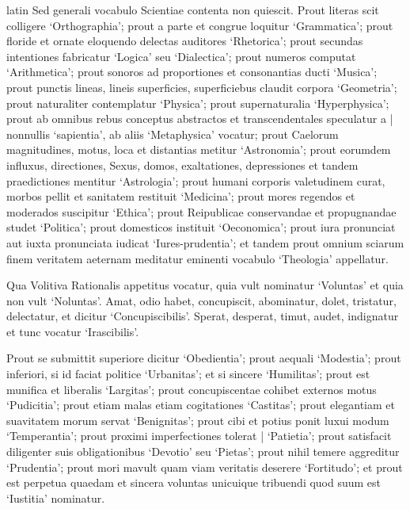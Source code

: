 \begin{otherlanguage*}{latin}
\pstart
 Sed generali vocabulo Scientiae contenta non quiescit. Prout literas scit colligere `Orthographia'; prout a parte et congrue loquitur `Grammatica'; prout floride et ornate eloquendo delectas auditores `Rhetorica'; prout secundas intentiones fabricatur `Logica' seu `Dialectica'; prout numeros computat `Arithmetica'; prout sonoros ad proportiones et consonantias ducti `Musica'; prout punctis lineas, lineis superficies, superficiebus claudit corpora `Geometria'; prout naturaliter contemplatur `Physica'; prout supernaturalia `Hyperphysica'; prout ab omnibus rebus conceptus abstractos et transcendentales speculatur a \textnormal{|}  nonnullis `sapientia', ab aliis `Metaphysica' vocatur; prout Caelorum magnitudines, motus, loca et distantias metitur `Astronomia'; prout eorumdem influxus, directiones, Sexus, domos, exaltationes, depressiones et tandem praedictiones mentitur `Astrologia'; prout humani corporis valetudinem curat, morbos pellit et sanitatem restituit `Medicina'; prout mores regendos et moderados suscipitur `Ethica'; prout Reipublicae conservandae et propugnandae studet `Politica'; prout domesticos instituit `Oeconomica'; prout iura pronunciat aut iuxta  pronunciata iudicat `Iures-prudentia'; et tandem prout omnium sciarum finem veritatem aeternam meditatur eminenti vocabulo `Theologia' appellatur. 
\pend

\pstart
 Qua Volitiva Rationalis appetitus vocatur, quia vult nominatur `Voluntas' et quia non vult `Noluntas'. Amat, odio habet, concupiscit, abominatur, dolet, tristatur, delectatur, et dicitur `Concupiscibilis'. Sperat, desperat, timut, audet, indignatur et tunc vocatur `Irascibilis'. 
\pend

\pstart
 Prout se submittit superiore dicitur `Obedientia'; prout aequali `Modestia'; prout inferiori, si id faciat politice `Urbanitas'; et si sincere `Humilitas'; prout est munifica et liberalis `Largitas'; prout concupiscentae cohibet externos motus `Pudicitia'; prout etiam malas etiam cogitationes `Castitas'; prout elegantiam et suavitatem morum servat `Benignitas'; prout cibi et potius ponit luxui modum `Temperantia'; prout proximi imperfectiones tolerat \textnormal{|} `Patietia'; prout satisfacit diligenter suis obligationibus `Devotio' seu `Pietas'; prout nihil temere aggreditur `Prudentia'; prout mori mavult quam viam veritatis deserere `Fortitudo'; et prout est perpetua quaedam et sincera voluntas unicuique tribuendi quod suum est `Iustitia' nominatur. 
\pend


\end{otherlanguage*}
